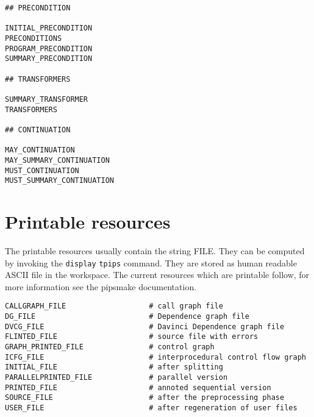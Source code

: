 \documentclass[a4paper,12pt]{article}
\begin{document}
\begin{verbatim}
## PRECONDITION                   

INITIAL_PRECONDITION                    
PRECONDITIONS    
PROGRAM_PRECONDITION
SUMMARY_PRECONDITION

## TRANSFORMERS 

SUMMARY_TRANSFORMER
TRANSFORMERS 

## CONTINUATION 

MAY_CONTINUATION
MAY_SUMMARY_CONTINUATION
MUST_CONTINUATION
MUST_SUMMARY_CONTINUATION
\end{verbatim}

\section{Printable resources}
\label{resf}
The printable resources usually contain the string FILE. They can be
computed by invoking the \verb+display+ {\tt tpips} command. They are stored as
human readable ASCII file in the workspace. The current resources which
are printable follow, for more information see the pipsmake documentation.

\begin{verbatim}
CALLGRAPH_FILE                   # call graph file
DG_FILE                          # Dependence graph file         
DVCG_FILE                        # Davinci Dependence graph file 
FLINTED_FILE                     # source file with errors
GRAPH_PRINTED_FILE               # control graph
ICFG_FILE                        # interprocedural control flow graph       
INITIAL_FILE                     # after splitting      
PARALLELPRINTED_FILE             # parallel version
PRINTED_FILE                     # annoted sequential version 
SOURCE_FILE                      # after the preprocessing phase
USER_FILE                        # after regeneration of user files
\end{verbatim}
\end{document}
